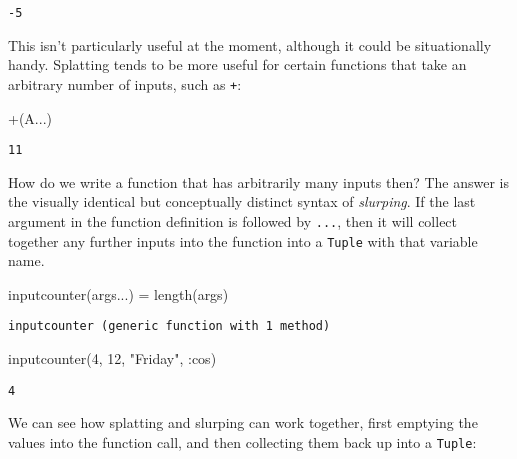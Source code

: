 \documentclass[
  letterpaper,
  DIV=11,
  numbers=noendperiod]{scrreprt}
\newenvironment{Shaded}{\begin{snugshade}}{\end{snugshade}}
\newcommand{\FloatTok}[1]{\textcolor[rgb]{0.68,0.00,0.00}{#1}}
\newcommand{\FunctionTok}[1]{\textcolor[rgb]{0.28,0.35,0.67}{#1}}
\newcommand{\NormalTok}[1]{\textcolor[rgb]{0.00,0.23,0.31}{#1}}
\newcommand{\OperatorTok}[1]{\textcolor[rgb]{0.37,0.37,0.37}{#1}}
\newcommand{\StringTok}[1]{\textcolor[rgb]{0.13,0.47,0.30}{#1}}
\begin{document}
\begin{verbatim}
-5
\end{verbatim}

This isn't particularly useful at the moment, although it could be
situationally handy. Splatting tends to be more useful for certain
functions that take an arbitrary number of inputs, such as \texttt{+}:

\begin{Shaded}
\begin{Highlighting}[]
\FunctionTok{+}\NormalTok{(A}\OperatorTok{...}\NormalTok{)}
\end{Highlighting}
\end{Shaded}

\begin{verbatim}
11
\end{verbatim}

How do we write a function that has arbitrarily many inputs then? The
answer is the visually identical but conceptually distinct syntax of
\emph{slurping}. If the last argument in the function definition is
followed by \texttt{...}, then it will collect together any further
inputs into the function into a \texttt{Tuple} with that variable name.

\begin{Shaded}
\begin{Highlighting}[]
\FunctionTok{inputcounter}\NormalTok{(args}\OperatorTok{...}\NormalTok{) }\OperatorTok{=} \FunctionTok{length}\NormalTok{(args)}
\end{Highlighting}
\end{Shaded}

\begin{verbatim}
inputcounter (generic function with 1 method)
\end{verbatim}

\begin{Shaded}
\begin{Highlighting}[]
\FunctionTok{inputcounter}\NormalTok{(}\FloatTok{4}\NormalTok{, }\FloatTok{12}\NormalTok{, }\StringTok{"Friday"}\NormalTok{, }\OperatorTok{:}\NormalTok{cos)}
\end{Highlighting}
\end{Shaded}

\begin{verbatim}
4
\end{verbatim}

We can see how splatting and slurping can work together, first emptying
the values into the function call, and then collecting them back up into
a \texttt{Tuple}:
\end{document}
